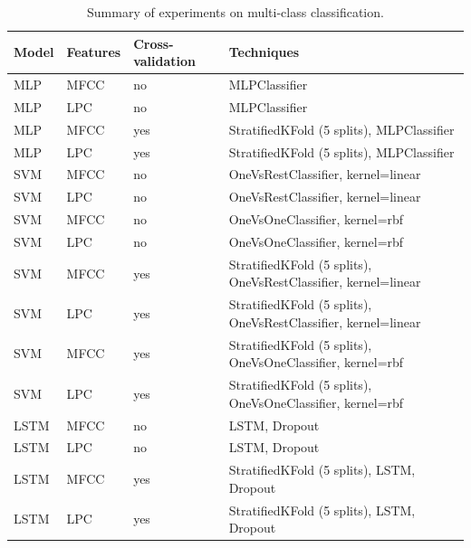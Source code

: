 \renewcommand{\arraystretch}{1.5} %
\setlength\extrarowheight{5pt} %
\begin{table}[!ht]
    \small
    \setlength\extrarowheight{2pt} %
    \begin{tabularx}{\textwidth}{>{\centering\arraybackslash}m{1.5cm} >{\centering\arraybackslash}m{1.5cm} >{\centering\arraybackslash}m{4cm} >{\centering\arraybackslash}m{8cm}}
    \hline
    \rowcolor{orange!10}
    \centering \textbf{Model} & \centering \textbf{Features} & \centering \textbf{Cross-validation} & \centering \textbf{Techniques} \\
    \hline
    MLP & MFCC & no & MLPClassifier \\
    MLP & LPC & no & MLPClassifier \\
    MLP & MFCC & yes & StratifiedKFold (5 splits), MLPClassifier \\
    MLP & LPC & yes & StratifiedKFold (5 splits), MLPClassifier \\
    SVM & MFCC & no & OneVsRestClassifier, kernel=linear \\
    SVM & LPC & no & OneVsRestClassifier, kernel=linear \\
    SVM & MFCC & no & OneVsOneClassifier, kernel=rbf \\
    SVM & LPC & no & OneVsOneClassifier, kernel=rbf \\
    SVM & MFCC & yes & StratifiedKFold (5 splits), OneVsRestClassifier, kernel=linear \\
    SVM & LPC & yes & StratifiedKFold (5 splits), OneVsRestClassifier, kernel=linear \\
    SVM & MFCC & yes & StratifiedKFold (5 splits), OneVsOneClassifier, kernel=rbf \\
    SVM & LPC & yes & StratifiedKFold (5 splits), OneVsOneClassifier, kernel=rbf \\
    LSTM & MFCC & no & LSTM, Dropout \\
    LSTM & LPC & no & LSTM, Dropout \\
    LSTM & MFCC & yes & StratifiedKFold (5 splits), LSTM, Dropout \\
    LSTM & LPC & yes & StratifiedKFold (5 splits), LSTM, Dropout \\
    \hline
    \end{tabularx}
    \vspace{10pt} 
    \caption{Summary of experiments on multi-class classification.}
    \label{table:multi-class-experiments}
\end{table}

